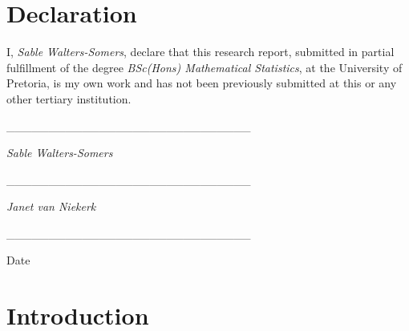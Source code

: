 \documentclass[english]{article}
\theoremstyle{plain}
\begin{document}
\section*{Declaration}

I, \emph{Sable Walters-Somers}, declare that this research report, submitted in
partial fulfillment of the degree \emph{BSc(Hons) Mathematical Statistics}, at
the University of Pretoria, is my own work and has not been previously
submitted at this or any other tertiary institution. 

\vspace{1cm}

\_\_\_\_\_\_\_\_\_\_\_\_\_\_\_\_\_\_\_\_\_\_\_\_\_\_\_\_\_

\emph{Sable Walters-Somers}

\vspace{1cm}

\_\_\_\_\_\_\_\_\_\_\_\_\_\_\_\_\_\_\_\_\_\_\_\_\_\_\_\_\_

\emph{Janet van Niekerk}

\vspace{1cm}

\_\_\_\_\_\_\_\_\_\_\_\_\_\_\_\_\_\_\_\_\_\_\_\_\_\_\_\_\_

Date

\newpage{}

\tableofcontents{}

\listoffigures

\listoftables

\newpage{}

\section{Introduction}


\end{document}
